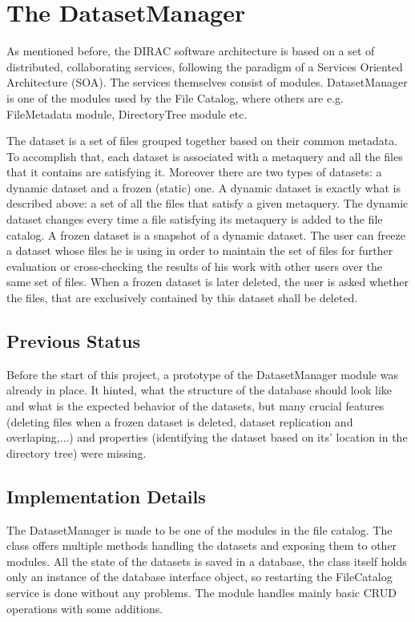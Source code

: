 \chapter{The DatasetManager}

As mentioned before, the DIRAC software architecture is based on a set of distributed,
collaborating services, following the paradigm of a Services
Oriented Architecture (SOA). The services themselves consist of
modules. DatasetManager is one of the modules used by the File Catalog, where others are
e.g. FileMetadata module, DirectoryTree module etc. 

The dataset is a set of files grouped together based on their common metadata. To accomplish
that, each dataset is associated with a metaquery and all the files that it contains are
satisfying it. Moreover there are two types of datasets: a dynamic dataset and 
a frozen (static) one. A dynamic dataset is exactly what is described above: a set of all the
files that satisfy a given metaquery. The dynamic dataset changes every time a file satisfying
its metaquery is added to the file catalog. A frozen dataset is a snapshot of a dynamic dataset. The
user can freeze a dataset whose files he is using in order to maintain the set of files for
further evaluation or cross-checking the results of his work with other users over the same
set of files. When a frozen dataset is later deleted, the user is asked whether the files, that 
are exclusively contained by this dataset shall be deleted. 

\section{Previous Status}
Before the start of this project, a prototype of the DatasetManager module was already 
in place. It hinted, what the structure of the database should look like and what is the
expected behavior of the datasets, but many crucial features (deleting files when a 
frozen dataset is deleted, dataset replication and overlaping,...) and properties (identifying
the dataset based on its' location in the directory tree) were missing.

\section{Implementation Details}

The DatasetManager is made to be one of the modules in the file catalog. The class offers
multiple methods handling the datasets and exposing them to other modules. All the state of the 
datasets is saved in a database, the class itself holds only an instance of the database interface
object, so restarting the FileCatalog service is done without any problems. The module handles mainly
basic CRUD operations with some additions.

